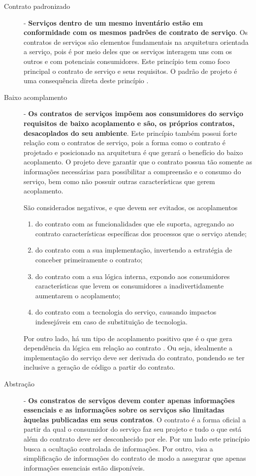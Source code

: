 \begin{description}
\item[Contrato padronizado] - \textbf{Serviços dentro de um mesmo inventário
estão em conformidade com os mesmos padrões de contrato de serviço}.
Os contratos de serviços são elementos fundamentais na arquitetura orientada a
serviço, pois é por meio deles que os serviços interagem uns com os outros e com
potenciais consumidores. Este princípio tem como foco principal o contrato de
serviço e seus requisitos. O padrão de projeto \CtFirst{} é uma
consequência direta deste princípio \cite{erl2009web}.

\item[Baixo acomplamento] - \textbf{Os contratos de serviços impõem aos
consumidores do serviço requisitos de baixo acoplamento e são, os próprios
contratos, desacoplados do seu ambiente}. 
Este princípio também possui forte relação com o contratos de serviço, pois a
forma como o contrato é projetado e posicionado na arquitetura é que gerará o
benefício do baixo acoplamento. O projeto deve garantir que o contrato
possua tão somente as informações necessárias para possibilitar a compreensão e
o consumo do serviço, bem como não possuir outras características que gerem
acoplamento.

São considerados negativos, e que devem ser evitados, os acoplamentos  
\begin{enumerate}[label=(\alph*)] 
\item do contrato com as funcionalidades que ele suporta, agregando ao
contrato características específicas dos processos que o serviço atende;
\item do contrato com a sua implementação, invertendo a estratégia de conceber
primeiramente o contrato;
\item do contrato com a sua lógica interna, expondo aos consumidores
características que levem os consumidores a inadivertidamente aumentarem o
acoplamento;
\item do contrato com a tecnologia do serviço, causando impactos indesejáveis em
caso de substituição de tecnologia.
\end{enumerate}

Por outro lado, há um tipo de acoplamento positivo que é o que gera dependência
da lógica em relação ao contrato \cite{erl2009web}. Ou seja, idealmente a
implementação do serviço deve ser derivada do contrato, pondendo se ter inclusive a geração de código a
partir do contrato.


\item[Abstração] - \textbf{Os constratos de serviços devem conter apenas
informações essenciais e as informações sobre os serviços são limitadas àquelas
publicadas em seus contratos}. O contrato é a forma oficial a partir da qual o
consumidor do serviço faz seu projeto e tudo o que está além do contrato deve
ser desconhecido por ele. Por um lado este princípio busca a ocultação
controlada de informações. Por outro, visa a simplificação de informações do
contrato de modo a assegurar que apenas informações essenciais estão
disponíveis.



\end{description}
